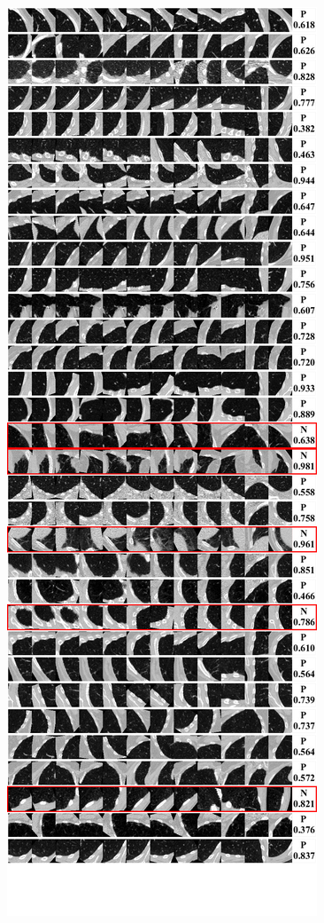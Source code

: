 \documentclass[onecolumn]{IEEEtran}
\begin{document}
\begin{figure}[H]
{\includegraphics[width=0.45\columnwidth]{./images/elcap-nodules-tail3}
}
\end{figure}

\newpage
\end{document}
